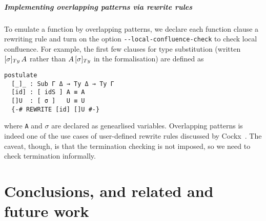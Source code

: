 \documentclass[a4paper,UKenglish,numberwithinsect,cleveref,thm-restate]{lipics-v2021}
\newcommand{\LT}[2][]{\todo[inline,author={L-T},caption={},color={pink},#1]{#2}}
\begin{document}
\subparagraph*{Implementing overlapping patterns via rewrite rules}
To emulate a function by overlapping patterns, we declare each function clause a rewriting rule and turn on the option \texttt{-{}-local-confluence-check}  to check local confluence.
For example, the first few clauses for type substitution (written $[\sigma]_{\Ty}\,A$ rather than $\subTy{A}{\sigma}$ in the formalisation) are defined as
\begin{lstlisting}
postulate
  [_]_ : Sub Γ Δ → Ty Δ → Ty Γ
  [id] : [ idS ] A ≡ A
  []U  : [ σ ]   U ≡ U
  {-# REWRITE [id] []U #-}
\end{lstlisting}
where \lstinline|A| and $\sigma$ are declared as genearlised variables.
%
Overlapping patterns is indeed one of the use cases of user-defined rewrite rules discussed by Cockx~\cite{Cockx2020}.
The caveat, though, is that the termination checking is not imposed, so we need to check termination informally.

%
% 
%

\section{Conclusions, and related and future work}\label{sec:conclusion}
\end{document}
